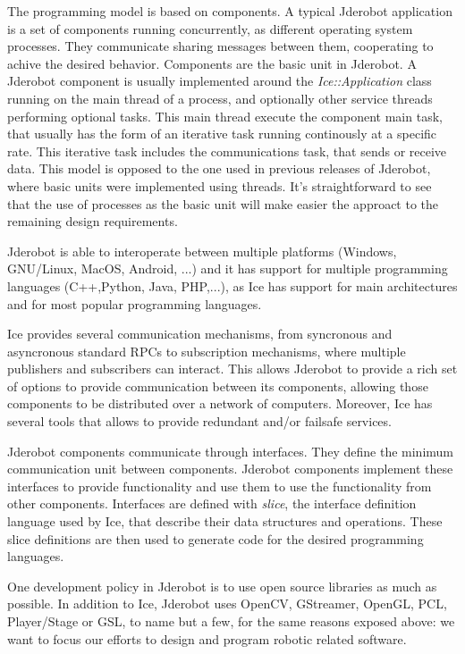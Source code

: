 \documentclass[twocolumn]{svjour3}          %
\begin{document}
The programming model is based on components. A typical Jderobot application is a set of components running concurrently, as different operating system processes. They communicate sharing messages between them, cooperating to achive the desired behavior. Components are the basic unit in Jderobot. A Jderobot component is usually implemented around the \textit{Ice::Application} class running on the main thread of a process, and optionally other service threads performing optional tasks. This main thread execute the component main task, that usually has the form of an iterative task running continously at a specific rate. This iterative task includes the communications task, that sends or receive data. This model is opposed to the one used in previous releases of Jderobot, where basic units were implemented using threads. It's straightforward to see that the use of processes as the basic unit will make easier the approact to the remaining design requirements.

Jderobot is able to interoperate between multiple platforms (Windows, GNU/Linux, MacOS, Android, ...) and it has support for multiple programming languages (C++,Python, Java, PHP,...), as Ice has support for main architectures and for most popular programming languages.

Ice provides several communication mechanisms, from syncronous and asyncronous standard RPCs to subscription mechanisms, where multiple publishers and subscribers can interact. This allows Jderobot to provide a rich set of options to provide communication between its components, allowing those components to be distributed over a network of computers. Moreover, Ice has several tools that allows to provide redundant and/or failsafe services.

Jderobot components communicate through interfaces. They define the minimum communication unit between components. Jderobot components implement these interfaces to provide functionality and use them to use the functionality from other components. Interfaces are defined with \textit{slice}, the interface definition language used by Ice, that describe their data structures and operations. These slice definitions are then used to generate code for the desired programming languages.

One development policy in Jderobot is to use open source libraries as much as possible. In addition to Ice, Jderobot uses OpenCV, GStreamer, OpenGL, PCL, Player/Stage or GSL, to name but a few, for the same reasons exposed above: we want to focus our efforts to design and program robotic related software. 
\end{document}
